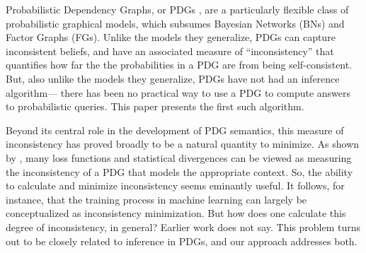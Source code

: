 \documentclass[twoside]{article}
\begin{document}
Probabilistic Dependency Graphs, or PDGs \parencite{pdg-aaai},
are a particularly flexible class of probabilistic graphical models, which subsumes Bayesian Networks (BNs)
and Factor Graphs (FGs).
Unlike the models they generalize,
PDGs can capture inconsistent beliefs, and have an associated measure
of ``inconsistency'' that quantifies how far the the probabilities in a PDG are from being self-consistent.
But, also unlike the models they generalize,
PDGs have not had an inference algorithm---%
there has been no practical way to use a PDG to compute answers to
probabilistic queries.
This paper presents the first such algorithm.

Beyond its central role in the development of PDG semantics, this measure of inconsistency has proved broadly to be a natural quantity to minimize.
As shown by \textcite{one-true-loss},
many
    loss functions and statistical divergences
    can be viewed as measuring the inconsistency
    of a PDG that models the appropriate context.
So, the ability to calculate and minimize inconsistency seems eminantly useful.
It follows, for instance, that the training process in machine learning can largely be conceptualized as inconsistency minimization.
But how {does} one calculate this degree of inconsistency, in general?
Earlier work does not say.
%
This problem turns out to be closely related to inference in PDGs,
and our approach addresses both.
\end{document}
